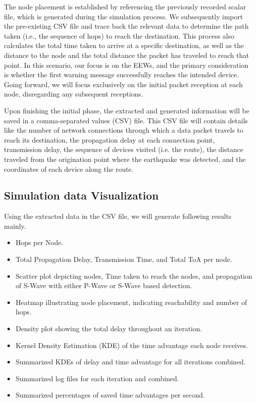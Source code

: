 The node placement is established by referencing the previously recorded scalar file, which is generated during the simulation process. We subsequently import the pre-existing CSV file and trace back the relevant data to determine the path taken (i.e., the sequence of hops) to reach the destination. This process also calculates the total time taken to arrive at a specific destination, as well as the distance to the node and the total distance the packet has traveled to reach that point. In this scenario, our focus is on the \ac{EEWs}, and the primary consideration is whether the first warning message successfully reaches the intended device. Going forward, we will focus exclusively on the initial packet reception at each node, disregarding any subsequent receptions.

Upon finishing the initial phase, the extracted and generated information will be saved in a comma-separated values (CSV) file. This CSV file will contain details like the number of network connections through which a data packet travels to reach its destination, the propagation delay at each connection point, transmission delay, the sequence of devices visited (i.e. the route), the distance traveled from the origination point where the earthquake was detected, and the coordinates of each device along the route.

\subsection{Simulation data Visualization}
Using the extracted data in the CSV file, we will generate following results mainly.

\begin{itemize}
\item Hops per Node.
\item Total Propagation Delay, Transmission Time, and Total \ac{ToA} per node.
\item Scatter plot depicting nodes, Time taken to reach the nodes, and propagation of S-Wave with either P-Wave or S-Wave based detection.
\item Heatmap illustrating node placement, indicating reachability and number of hops.
\item Density plot showing the total delay throughout an iteration.
\item Kernel Density Estimation (KDE) of the time advantage each node receives.
\item Summarized KDEs of delay and time advantage for all iterations combined.
\item Summarized log files for each iteration and combined.
\item Summarized percentages of saved time advantages per second.
\end{itemize}